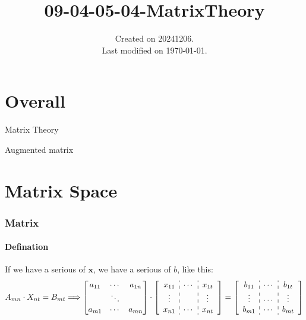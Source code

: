 \documentclass[UTF8]{../../09-Mathematics}
\begin{document}
\title{09-04-05-04-MatrixTheory}
\date{Created on 20241206.\\   Last modified on \today.}
\maketitle
\tableofcontents






\chapter{Overall}

Matrix Theory



Augmented matrix



\chapter{Matrix Space}

\subsection{Matrix}


\subsubsection{Defination}

If we have a serious of $\boldsymbol x$, we have a serious of $b$, like this:
\begin{equation}
  A_{mn} \cdot X_{nt} = B_{mt}
  \Longrightarrow
  \begin{bmatrix}
     a_{11} & \cdots & a_{1n}\\
     & \ddots & \\
     a_{m1} & \cdots & a_{mn} \\
  \end{bmatrix}
  \cdot
  \left[
    \begin{array}{c:c:c}
      x_{11} & \cdots & x_{1t}\\
     \vdots&  & \vdots \\
     x_{n1} & \cdots & x_{nt} \\
    \end{array}
 \right] 
  =
 \left[
    \begin{array}{c:c:c}
      b_{11} & \cdots & b_{1t}\\
      \vdots& \cdots & \vdots \\
      b_{m1} & \cdots & b_{mt} \\
    \end{array}
 \right] 
\end{equation}
\end{document}
